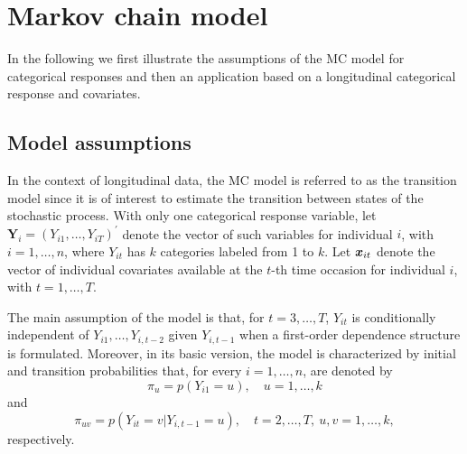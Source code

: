\hypertarget{sec:MCmod}{%
\section{Markov chain model}\label{sec:MCmod}}

In the following we first illustrate the assumptions of the MC model for
categorical responses and then an application based on a longitudinal
categorical response and covariates.

\hypertarget{subsec:MCassump}{%
\subsection{Model assumptions}\label{subsec:MCassump}}

In the context of longitudinal data, the MC model is referred to as
the transition model \citep{anderson:54} since it is
of interest to estimate the transition between states of the stochastic
process. With only one categorical response variable, let
\(\mathbf{Y}_{i} = (Y_{i1},\ldots,Y_{iT})^\prime\) denote the vector of
such variables for individual \(i\), with \(i=1,\ldots,n\), where \(Y_{it}\)
has \(k\) categories labeled from 1 to \(k\). Let \(\mbox{\boldmath $x$}_{it}\) denote the
vector of individual covariates available at the \(t\)-th time occasion
for individual \(i\), with \(t=1,\ldots,T\).

The main assumption of the model is that, for \(t=3,\ldots,T\), \(Y_{it}\)
is conditionally independent of \(Y_{i1}, \ldots, Y_{i,t-2}\) given
\(Y_{i,t-1}\) when a first-order dependence structure is formulated.
Moreover, in its basic version, the model is characterized by initial
and transition probabilities that, for every \(i = 1,\ldots, n\), are
denoted by \[
\pi_{u} = p(Y_{i1} = u),  \quad u = 1,\ldots,k
\] and \[
\pi_{uv} = p(Y_{it} = v | Y_{i,t-1}= u),\quad t=2,\ldots,T,\: u,v=1,\ldots,k,
\] respectively.

